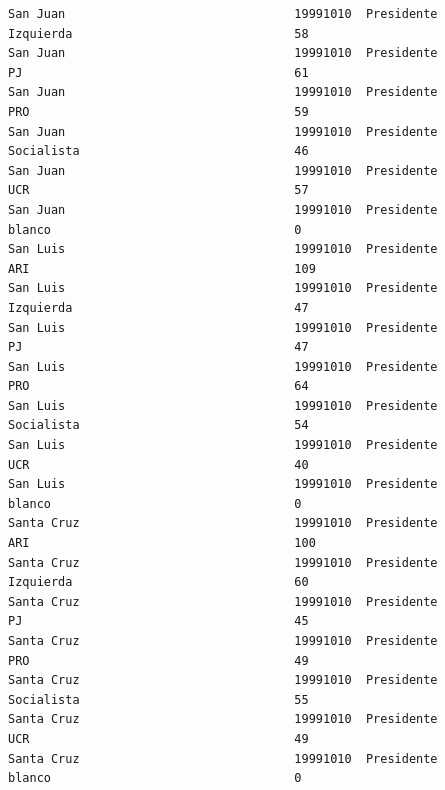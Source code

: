 \documentclass[a4paper,10pt]{article}
\begin{document}
\begin{verbatim}
San Juan                                19991010  Presidente                    Izquierda                               58             
San Juan                                19991010  Presidente                    PJ                                      61             
San Juan                                19991010  Presidente                    PRO                                     59             
San Juan                                19991010  Presidente                    Socialista                              46             
San Juan                                19991010  Presidente                    UCR                                     57             
San Juan                                19991010  Presidente                    blanco                                  0              
San Luis                                19991010  Presidente                    ARI                                     109            
San Luis                                19991010  Presidente                    Izquierda                               47             
San Luis                                19991010  Presidente                    PJ                                      47             
San Luis                                19991010  Presidente                    PRO                                     64             
San Luis                                19991010  Presidente                    Socialista                              54             
San Luis                                19991010  Presidente                    UCR                                     40             
San Luis                                19991010  Presidente                    blanco                                  0              
Santa Cruz                              19991010  Presidente                    ARI                                     100            
Santa Cruz                              19991010  Presidente                    Izquierda                               60             
Santa Cruz                              19991010  Presidente                    PJ                                      45             
Santa Cruz                              19991010  Presidente                    PRO                                     49             
Santa Cruz                              19991010  Presidente                    Socialista                              55             
Santa Cruz                              19991010  Presidente                    UCR                                     49             
Santa Cruz                              19991010  Presidente                    blanco                                  0              

\end{verbatim}
\end{document}
